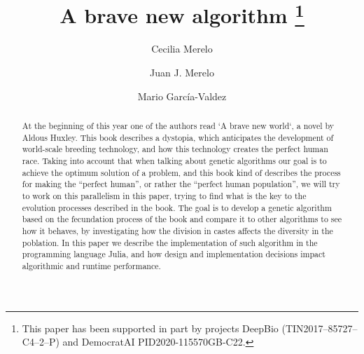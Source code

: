 \documentclass[runningheads]{llncs}
\begin{document}
%
\title{A brave new algorithm \thanks{This paper has been supported in part by projects DeepBio (TIN2017--85727--C4--2--P) and DemocratAI PID2020-115570GB-C22.}}
%
%
\author{Cecilia Merelo \and
Juan J. Merelo \and Mario Garc\'ia-Valdez
 }
%
%
%
\maketitle              %
%
\begin{abstract}

At the beginning of this year one of the authors read `A brave new
world`, a novel by Aldous Huxley.  This book describes a dystopia,
which anticipates the development of world-scale breeding technology,
and how this technology creates the perfect human race. Taking into
account that when talking about genetic algorithms our goal is to
achieve the optimum solution of a problem, and this book kind of
describes the process for making the “perfect human”, or rather the
``perfect human population'', we will try to work on this parallelism
in this paper, trying to find what is the key to the evolution
processes described in the book. The goal is to develop a genetic
algorithm based on the fecundation process of the book and compare it
to other algorithms to see how it behaves, by investigating how the
division in castes affects the diversity in the poblation. In this
paper we describe the implementation of such algorithm in the
programming language Julia, and how design and implementation
decisions impact algorithmic and runtime performance.

\end{abstract}










\end{document}
